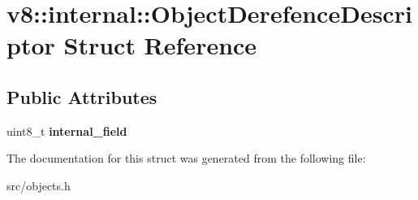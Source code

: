 \hypertarget{structv8_1_1internal_1_1_object_derefence_descriptor}{}\section{v8\+:\+:internal\+:\+:Object\+Derefence\+Descriptor Struct Reference}
\label{structv8_1_1internal_1_1_object_derefence_descriptor}
\subsection*{Public Attributes}
\begin{DoxyCompactItemize}
\item 
\hypertarget{structv8_1_1internal_1_1_object_derefence_descriptor_aca8abb3ae4e6a31a883dbed87892469d}{}uint8\+\_\+t {\bfseries internal\+\_\+field}\label{structv8_1_1internal_1_1_object_derefence_descriptor_aca8abb3ae4e6a31a883dbed87892469d}

\end{DoxyCompactItemize}


The documentation for this struct was generated from the following file\+:\begin{DoxyCompactItemize}
\item 
src/objects.\+h\end{DoxyCompactItemize}
